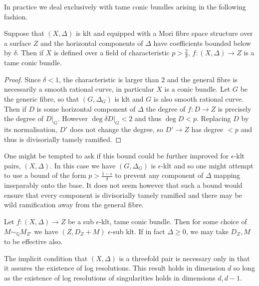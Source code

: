 In practice we deal exclusively with tame conic bundles arising in the following fashion.

\begin{lemma}\label{S2}
	Suppose that $(X,\Delta)$ is klt and equipped with a Mori fibre space structure over a surface $Z$ and the horizontal components of $\Delta$ have coefficients bounded below by $\delta$. Then if $X$ is defined over a field of characteristic $p > \frac{2}{\delta}$, $f\colon (X,\Delta) \to Z$ is a tame conic bundle.
\end{lemma}
\begin{proof}
	
	Since $\delta <1$, the characteristic is larger than $2$ and the general fibre is necessarily a smooth rational curve, in particular $X$ is a conic bundle. Let $G$ be the generic fibre, so that $(G,\Delta_{G})$ is klt and $G$ is also smooth rational curve. Then if $D$ is some horizontal component of $\Delta$ the degree of $f\colon D \to Z$ is precisely the degree of $D|_{G}$. However $\deg \delta D|_{G} <2$ and thus $\deg D < p$. Replacing $D$ by its normalisation, $D'$ does not change the degree, so $D'\to Z$ has degree $<p$ and thus is divisorially tamely ramified.
\end{proof}

\begin{remark}
	One might be tempted to ask if this bound could be further improved for $\epsilon$-klt pairs, $(X,\Delta)$. In this case we have $(G,\Delta_{G})$ is $\epsilon$-klt and so one might attempt to use a bound of the form $p > \frac{1-\epsilon}{\delta}$ to prevent any component of $\Delta$ mapping inseparably onto the base. It does not seem however that such a bound would ensure that every component is divisorially tamely ramified and there may be wild ramification away from the general fibre. 
\end{remark}

\begin{theorem}\label{cbf}
	Let $f\colon (X,\Delta) \to Z$ be a sub $\epsilon$-klt, tame conic bundle. Then for some choice of $M\sim_{\mathbb{Q}} M_{Z'}$ we have $(Z,D_{Z}+M)$ $\epsilon$-sub klt. If in fact $\Delta \geq 0$, we may take $D_{Z},M$ to be effective also.
\end{theorem}
\begin{remark}
	The implicit condition that $(X,\Delta)$ is a threefold pair is necessary only in that it assures the existence of log resolutions. This result holds in dimension $d$ so long as the existence of log resolutions of singularities holds in dimensions $d,d-1$.
\end{remark}

